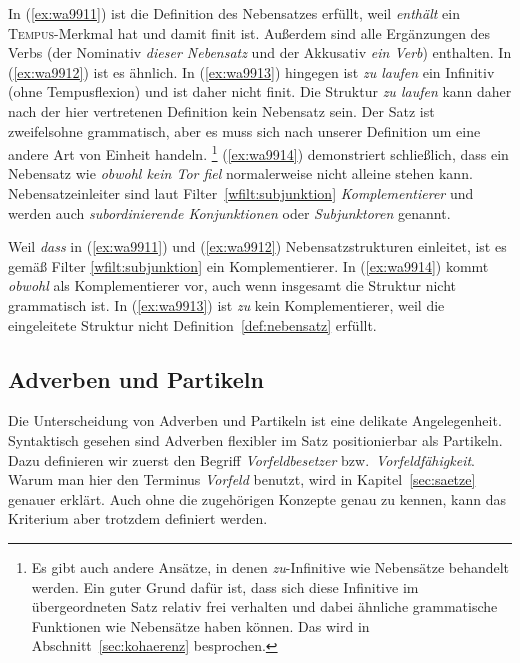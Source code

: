 In (\ref{ex:wa9911}) ist die Definition des Nebensatzes erfüllt, weil \textit{enthält} ein \textsc{Tempus}-Merkmal hat und damit finit ist.
Außerdem sind alle Ergänzungen des Verbs (der Nominativ \textit{dieser Nebensatz} und der Akkusativ \textit{ein Verb}) enthalten.
In (\ref{ex:wa9912}) ist es ähnlich.
In (\ref{ex:wa9913}) hingegen ist \textit{zu laufen} ein Infinitiv (ohne Tempusflexion) und ist daher nicht finit.
Die Struktur \textit{zu laufen} kann daher nach der hier vertretenen Definition kein Nebensatz sein.
Der Satz ist zweifelsohne grammatisch, aber es muss sich nach unserer Definition um eine andere Art von Einheit handeln.%
\footnote{Es gibt auch andere Ansätze, in denen \textit{zu}-Infinitive wie Nebensätze behandelt werden.
Ein guter Grund dafür ist, dass sich diese Infinitive im übergeordneten Satz relativ frei verhalten und dabei ähnliche grammatische Funktionen wie Nebensätze haben können.
Das wird in Abschnitt~\ref{sec:kohaerenz} besprochen.}
(\ref{ex:wa9914}) demonstriert schließlich, dass ein Nebensatz wie \textit{obwohl kein Tor fiel} normalerweise nicht alleine stehen kann.
Nebensatzeinleiter sind laut Filter~\ref{wfilt:subjunktion} \textit{Komplementierer} und werden auch \textit{subordinierende Konjunktionen} oder \textit{Subjunktoren} genannt.


Weil \textit{dass} in (\ref{ex:wa9911}) und (\ref{ex:wa9912}) Nebensatzstrukturen einleitet, ist es gemäß Filter \ref{wfilt:subjunktion} ein Komplementierer.
In (\ref{ex:wa9914}) kommt \textit{obwohl} als Komplementierer vor, auch wenn insgesamt die Struktur nicht grammatisch ist.
In (\ref{ex:wa9913}) ist \textit{zu} kein Komplementierer, weil die eingeleitete Struktur nicht Definition~\ref{def:nebensatz} erfüllt.

\subsection{Adverben und Partikeln}

\label{sec:adverbenpartikelnwortklassen}


Die Unterscheidung von Adverben und Partikeln ist eine delikate Angelegenheit.
Syntaktisch gesehen sind Adverben flexibler im Satz positionierbar als Partikeln. 
Dazu definieren wir zuerst den Begriff \textit{Vorfeldbesetzer} bzw.\ \textit{Vorfeldfähigkeit}.
Warum man hier den Terminus \textit{Vorfeld} benutzt, wird in Kapitel~\ref{sec:saetze} genauer erklärt.
Auch ohne die zugehörigen Konzepte genau zu kennen, kann das Kriterium aber trotzdem definiert werden.

